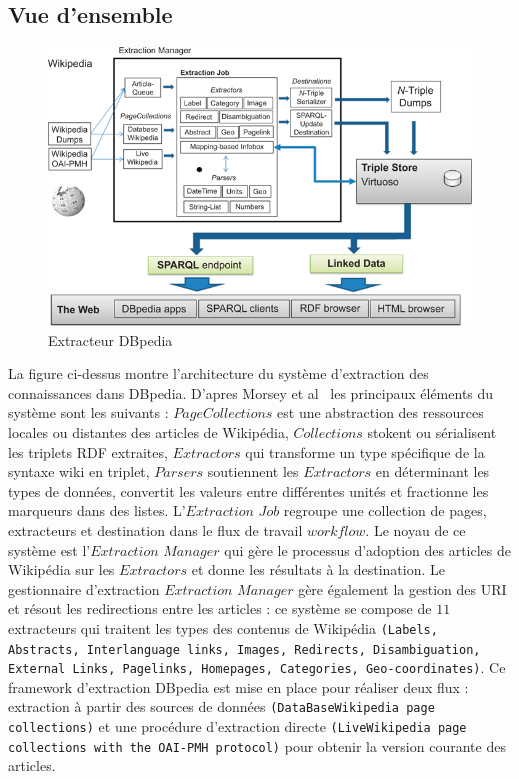 \subsection{Vue d'ensemble}
\begin{figure}[H]
\centering
\includegraphics[width=12cm]{dbpediaExtra.png}
\caption{Extracteur DBpedia}
\end{figure}
La figure ci-dessus montre l'architecture du système d'extraction des connaissances dans DBpedia.
D'apres Morsey et al~\cite{morsey2012} les principaux éléments du système sont les suivants : $PageCollections$ est une abstraction des ressources locales ou distantes des articles de Wikipédia, $Collections$ stokent ou sérialisent les triplets RDF extraites, $Extractors$ qui transforme un type spécifique de la syntaxe wiki en triplet, $Parsers$ soutiennent les $Extractors$ en déterminant les types de données, convertit les valeurs entre différentes unités et fractionne les marqueurs dans des listes. L'$Extraction$ $Job$ regroupe une collection de pages, extracteurs et destination dans le flux de travail $workflow$.
Le noyau de ce système est l'$Extraction$ $Manager$ qui gère le processus  d'adoption des articles de Wikipédia sur les $Extractors$ et donne les résultats à la destination.
Le gestionnaire d'extraction $Extraction$ $Manager$ gère également la gestion des URI et résout les redirections entre les articles : ce système se compose de $11$ extracteurs qui traitent les types des contenus de Wikipédia {\tt(Labels, Abstracts, Interlanguage links, Images, Redirects, Disambiguation,
External Links, Pagelinks, Homepages, Categories, Geo-coordinates)}.
Ce framework d'extraction DBpedia est mise en place pour réaliser deux flux : extraction à partir des sources de données {\tt(DataBaseWikipedia page collections)} et une procédure d'extraction directe
{\tt(LiveWikipedia page collections with the OAI-PMH protocol)} pour obtenir la version courante des articles.
